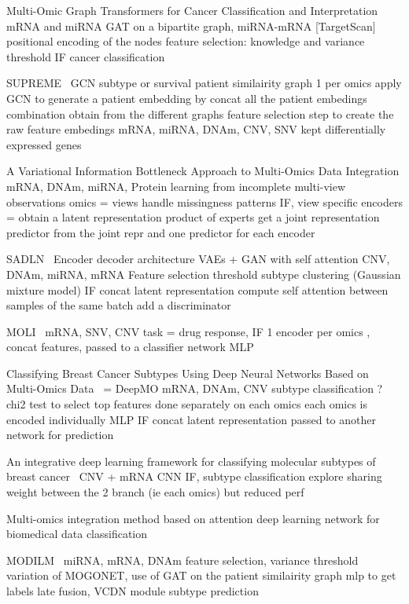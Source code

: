 \documentclass[../main.tex]{subfiles}
\begin{document}
		Multi-Omic Graph Transformers for Cancer Classification and Interpretation~\cite{Kaczmarek2021}
		mRNA and miRNA
		GAT on a bipartite graph, miRNA-mRNA [TargetScan]
		positional encoding of the nodes
		feature selection: knowledge and variance threshold
		IF  cancer classification

		SUPREME~\cite{Kesimoglu2022} GCN subtype or survival patient similairity graph 1 per omics
		apply GCN to generate a patient embedding by concat all the patient embedings combination obtain from the different graphs
		feature selection step to create the raw feature embedings
		mRNA, miRNA, DNAm, CNV, SNV
		kept differentially expressed genes

		A Variational Information Bottleneck Approach to Multi-Omics Data Integration
		\cite{Lee2021AVI}
		mRNA, DNAm, miRNA, Protein
		learning from incomplete multi-view observations
		omics = views handle missingness patterns
		IF, view specific encoders = obtain a latent representation
		product of experts get a joint representation
		predictor from the joint repr and one predictor for each encoder

		SADLN~\cite{SADLN} Encoder decoder architecture VAEs + GAN with self attention
		CNV, DNAm, miRNA, mRNA
		Feature selection threshold
		subtype clustering (Gaussian mixture model)
		IF concat latent representation
		compute self attention between samples of the same batch
		add a discriminator

		MOLI~\cite{MOLI}
		mRNA, SNV, CNV
		task = drug response, IF
		1 encoder per omics , concat features, passed to a classifier network
		MLP

		Classifying Breast Cancer Subtypes Using Deep Neural Networks Based on Multi-Omics Data~\cite{Lin2020} = DeepMO
		mRNA, DNAm, CNV
		subtype classification ?
		chi2 test to select top features done separately on each omics
		each omics is encoded individually MLP
		IF concat latent representation
		passed to another network for prediction



		An integrative deep learning framework for classifying molecular subtypes of breast cancer~\cite{MohaiminulIslam2020}
		CNV + mRNA
		CNN IF, subtype classification
		explore sharing weight between the 2 branch (ie each omics) but reduced perf



		Multi-omics integration method based on attention deep learning network for biomedical data classification

		MODILM~\cite{MODILM}
		miRNA, mRNA, DNAm
		feature selection, variance threshold
		variation of MOGONET, use of GAT on the patient similairity graph
		mlp to get labels
		late fusion, VCDN module
		subtype prediction
\end{document}
